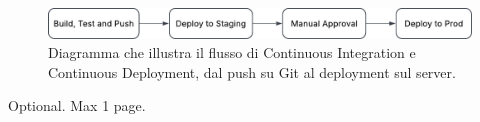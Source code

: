 \documentclass[12pt,a4paper,openright,twoside]{book}
\begin{document}
\begin{figure}[h!]
    \centering
    \includegraphics[width=\textwidth]{figures/workflow.pdf}
    \caption{Diagramma che illustra il flusso di Continuous Integration e Continuous Deployment, dal push su Git al deployment sul server.}
    \label{fig:ci_cd_diagram}
\end{figure}


\backmatter

\nocite{*} %




\begin{acknowledgements} %
    Optional. Max 1 page.
\end{acknowledgements}
\end{document}
